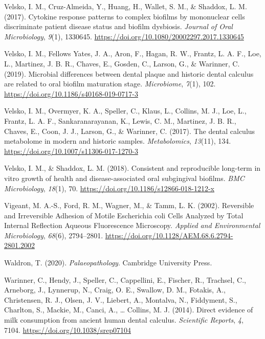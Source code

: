 \documentclass[
  letterpaper,
]{book}
\newlength{\cslhangindent}
\newlength{\cslentryspacingunit} %
\newenvironment{CSLReferences}[2] %
 {%
  \setlength{\parindent}{0pt}
  \ifodd #1
  \let\oldpar\par
  \def\par{\hangindent=\cslhangindent\oldpar}
  \fi
  \setlength{\parskip}{#2\cslentryspacingunit}
 }%
 {}
\begin{document}
\begin{CSLReferences}{1}{0}
\leavevmode{}%
Velsko, I. M., Cruz-Almeida, Y., Huang, H., Wallet, S. M., \& Shaddox,
L. M. (2017). Cytokine response patterns to complex biofilms by
mononuclear cells discriminate patient disease status and biofilm
dysbiosis. \emph{Journal of Oral Microbiology}, \emph{9}(1), 1330645.
\url{https://doi.org/10.1080/20002297.2017.1330645}

\leavevmode{}%
Velsko, I. M., Fellows Yates, J. A., Aron, F., Hagan, R. W., Frantz, L.
A. F., Loe, L., Martinez, J. B. R., Chaves, E., Gosden, C., Larson, G.,
\& Warinner, C. (2019). Microbial differences between dental plaque and
historic dental calculus are related to oral biofilm maturation stage.
\emph{Microbiome}, \emph{7}(1), 102.
\url{https://doi.org/10.1186/s40168-019-0717-3}

\leavevmode{}%
Velsko, I. M., Overmyer, K. A., Speller, C., Klaus, L., Collins, M. J.,
Loe, L., Frantz, L. A. F., Sankaranarayanan, K., Lewis, C. M., Martinez,
J. B. R., Chaves, E., Coon, J. J., Larson, G., \& Warinner, C. (2017).
The dental calculus metabolome in modern and historic samples.
\emph{Metabolomics}, \emph{13}(11), 134.
\url{https://doi.org/10.1007/s11306-017-1270-3}

\leavevmode{}%
Velsko, I. M., \& Shaddox, L. M. (2018). Consistent and reproducible
long-term in vitro growth of health and disease-associated oral
subgingival biofilms. \emph{BMC Microbiology}, \emph{18}(1), 70.
\url{https://doi.org/10.1186/s12866-018-1212-x}

\leavevmode{}%
Vigeant, M. A.-S., Ford, R. M., Wagner, M., \& Tamm, L. K. (2002).
Reversible and {Irreversible Adhesion} of {Motile Escherichia} coli
{Cells Analyzed} by {Total Internal Reflection Aqueous Fluorescence
Microscopy}. \emph{Applied and Environmental Microbiology},
\emph{68}(6), 2794--2801.
\url{https://doi.org/10.1128/AEM.68.6.2794-2801.2002}

\leavevmode{}%
Waldron, T. (2020). \emph{Palaeopathology}. {Cambridge University
Press}.

\leavevmode{}%
Warinner, C., Hendy, J., Speller, C., Cappellini, E., Fischer, R.,
Trachsel, C., Arneborg, J., Lynnerup, N., Craig, O. E., Swallow, D. M.,
Fotakis, A., Christensen, R. J., Olsen, J. V., Liebert, A., Montalva,
N., Fiddyment, S., Charlton, S., Mackie, M., Canci, A., \ldots{}
Collins, M. J. (2014). Direct evidence of milk consumption from ancient
human dental calculus. \emph{Scientific Reports}, \emph{4}, 7104.
\url{https://doi.org/10.1038/srep07104}


\end{CSLReferences}
\end{document}
